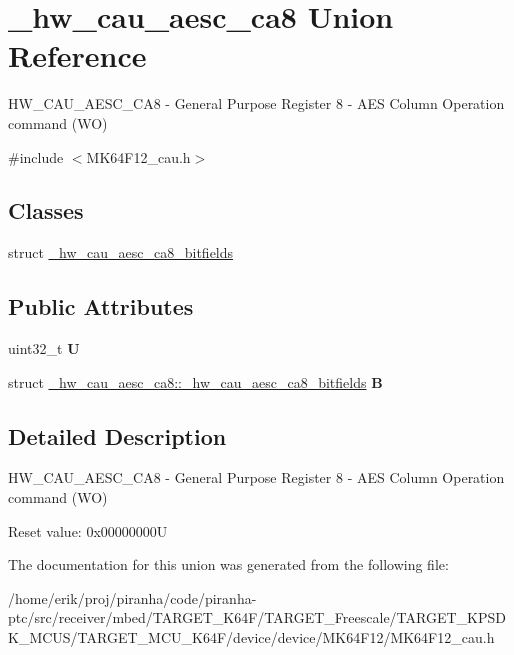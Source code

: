 \hypertarget{union__hw__cau__aesc__ca8}{}\section{\+\_\+hw\+\_\+cau\+\_\+aesc\+\_\+ca8 Union Reference}
\label{union__hw__cau__aesc__ca8}


H\+W\+\_\+\+C\+A\+U\+\_\+\+A\+E\+S\+C\+\_\+\+C\+A8 -\/ General Purpose Register 8 -\/ A\+ES Column Operation command (WO)  




{\ttfamily \#include $<$M\+K64\+F12\+\_\+cau.\+h$>$}

\subsection*{Classes}
\begin{DoxyCompactItemize}
\item 
struct \hyperlink{struct__hw__cau__aesc__ca8_1_1__hw__cau__aesc__ca8__bitfields}{\+\_\+hw\+\_\+cau\+\_\+aesc\+\_\+ca8\+\_\+bitfields}
\end{DoxyCompactItemize}
\subsection*{Public Attributes}
\begin{DoxyCompactItemize}
\item 
uint32\+\_\+t {\bfseries U}\hypertarget{union__hw__cau__aesc__ca8_a2b83e3765e69983ca0ea18fce4ce08d0}{}\label{union__hw__cau__aesc__ca8_a2b83e3765e69983ca0ea18fce4ce08d0}

\item 
struct \hyperlink{struct__hw__cau__aesc__ca8_1_1__hw__cau__aesc__ca8__bitfields}{\+\_\+hw\+\_\+cau\+\_\+aesc\+\_\+ca8\+::\+\_\+hw\+\_\+cau\+\_\+aesc\+\_\+ca8\+\_\+bitfields} {\bfseries B}\hypertarget{union__hw__cau__aesc__ca8_a9fc8280ddb86f743332ba32be17fc317}{}\label{union__hw__cau__aesc__ca8_a9fc8280ddb86f743332ba32be17fc317}

\end{DoxyCompactItemize}


\subsection{Detailed Description}
H\+W\+\_\+\+C\+A\+U\+\_\+\+A\+E\+S\+C\+\_\+\+C\+A8 -\/ General Purpose Register 8 -\/ A\+ES Column Operation command (WO) 

Reset value\+: 0x00000000U 

The documentation for this union was generated from the following file\+:\begin{DoxyCompactItemize}
\item 
/home/erik/proj/piranha/code/piranha-\/ptc/src/receiver/mbed/\+T\+A\+R\+G\+E\+T\+\_\+\+K64\+F/\+T\+A\+R\+G\+E\+T\+\_\+\+Freescale/\+T\+A\+R\+G\+E\+T\+\_\+\+K\+P\+S\+D\+K\+\_\+\+M\+C\+U\+S/\+T\+A\+R\+G\+E\+T\+\_\+\+M\+C\+U\+\_\+\+K64\+F/device/device/\+M\+K64\+F12/M\+K64\+F12\+\_\+cau.\+h\end{DoxyCompactItemize}
